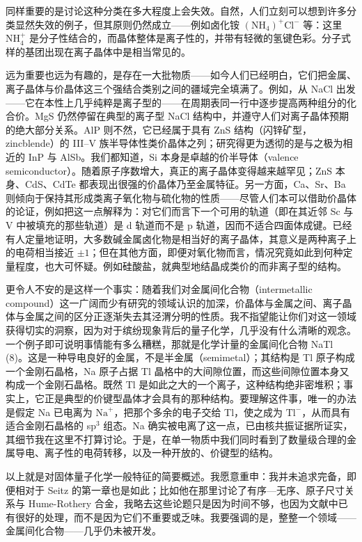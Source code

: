 同样重要的是讨论这种分类在多大程度上会失效。自然，人们立刻可以想到许多分类显然失效的例子，但其原则仍然成立——例如卤化铵 $(\mathrm{NH}_4)^+\mathrm{Cl}^-$ 等：这里 $\mathrm{NH}_4^+$ 是分子性结合的，而晶体整体是离子性的，并带有轻微的氢键色彩。分子式样的基团出现在离子晶体中是相当常见的。

远为重要也远为有趣的，是存在一大批物质——如今人们已经明白，它们把金属、离子晶体与价晶体这三个强结合类别之间的疆域完全填满了。例如，从 NaCl 出发——它在本性上几乎纯粹是离子型的——在周期表同一行中逐步提高两种组分的化合价。MgS 仍然停留在典型的离子型 NaCl 结构中，并遵守人们对离子晶体预期的绝大部分关系。AlP 则不然，它已经属于具有 ZnS 结构（闪锌矿型，zincblende）的 III--V 族半导体性类价晶体之列；研究得更为透彻的是与之极为相近的 InP 与 AlSb。我们都知道，Si 本身是卓越的价半导体（valence semiconductor）。随着原子序数增大，真正的离子晶体变得越来越罕见；ZnS 本身、CdS、CdTe 都表现出很强的价晶体乃至金属特征。另一方面，Ca、Sr、Ba 则倾向于保持其形成类离子氧化物与硫化物的性质——尽管人们本可以借助价晶体的论证，例如把这一点解释为：对它们而言下一个可用的轨道（即在其近邻 Sc 与 V 中被填充的那些轨道）是 d 轨道而不是 p 轨道，因而不适合四面体成键。已经有人定量地证明，大多数碱金属卤化物是相当好的离子晶体，其意义是两种离子上的电荷相当接近 $\pm 1$；但在其他方面，即便对氧化物而言，情况究竟如此到何种定量程度，也大可怀疑。例如硅酸盐，就典型地结晶成类价的而非离子型的结构。

更令人不安的是这样一个事实：随着我们对金属间化合物（intermetallic compound）这一广阔而少有研究的领域认识的加深，价晶体与金属之间、离子晶体与金属之间的区分正逐渐失去其泾渭分明的性质。我不指望能让你们对这一领域获得切实的洞察，因为对于缤纷现象背后的量子化学，几乎没有什么清晰的观念。一个例子即可说明事情能有多么糟糕，那就是化学计量的金属间化合物 NaTl (8)。这是一种导电良好的金属，不是半金属（semimetal）；其结构是 Tl 原子构成一个金刚石晶格，Na 原子占据 Tl 晶格中的大间隙位置，而这些间隙位置本身又构成一个金刚石晶格。既然 Tl 是如此之大的一个离子，这种结构绝非密堆积；事实上，它正是典型的价键型晶体才会具有的那种结构。要理解这件事，唯一的办法是假定 Na 已电离为 $\mathrm{Na}^+$，把那个多余的电子交给 Tl，使之成为 $\mathrm{Tl}^-$，从而具有适合金刚石晶格的 sp$^3$ 组态。Na 确实被电离了这一点，已由核共振证据所证实，其细节我在这里不打算讨论。于是，在单一物质中我们同时看到了数量级合理的金属导电、离子性的电荷转移，以及一种开放的、价键型的结构。

以上就是对固体量子化学一般特征的简要概述。我愿意重申：我并未追求完备，即便相对于 Seitz 的第一章也是如此；比如他在那里讨论了有序—无序、原子尺寸关系与 Hume-Rothery 合金，我略去这些论题只是因为时间不够，也因为文献中已有很好的处理，而不是因为它们不重要或乏味。我要强调的是，整整一个领域——金属间化合物——几乎仍未被开发。

